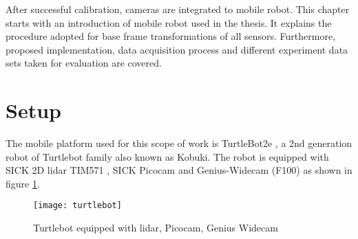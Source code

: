 After successful calibration, cameras are integrated to mobile robot. This chapter starts with an introduction of mobile robot used in the thesis. It explains the procedure adopted for base frame transformations of all sensors. Furthermore, proposed implementation, data acquisition process and different experiment data sets taken for evaluation are covered.

\section{Setup}
The mobile platform used for this scope of work is TurtleBot2e \cite{turtlebot2}, a 2nd generation robot of Turtlebot family also known as Kobuki. The robot is equipped with SICK 2D \acrshort{lidar} TIM571 \cite{sick}, SICK Picocam and Genius-Widecam (F100) as shown in figure \ref{fig:turtlebot}.
\begin{figure}[H]
	\centering
	\texttt{[image: turtlebot]}
	\caption{Turtlebot equipped with \acrshort{lidar}, Picocam, Genius Widecam}
	\label{fig:turtlebot}
\end{figure}
